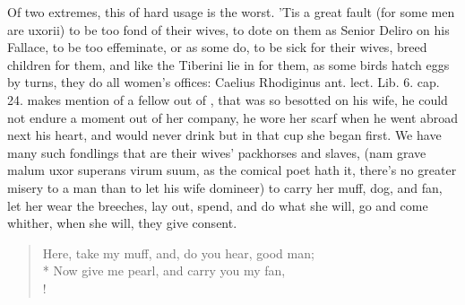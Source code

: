 Of two extremes, this of hard usage is the worst. 'Tis a great fault
(for some men are uxorii) to be too fond of their wives, to dote on
them as Senior Deliro on his Fallace, to be too effeminate, or as
some do, to be sick for their wives, breed children for them, and like
the  Tiberini lie in for them, as some birds hatch eggs by turns,
they do all women's offices: Caelius Rhodiginus ant. lect. Lib. 6. cap.
24. makes mention of a fellow out of \Seneca{}, that was so besotted
on his wife, he could not endure a moment out of her company, he wore
her scarf when he went abroad next his heart, and would never drink but
in that cup she began first. We have many such fondlings that are their
wives' packhorses and slaves, (nam grave malum uxor superans virum
suum, as the comical poet hath it, there's no greater misery to a man
than to let his wife domineer) to carry her muff, dog, and fan, let her
wear the breeches, lay out, spend, and do what she will, go and come
whither, when she will, they give consent.

\begin{verse}%
Here, take my muff, and, do you hear, good man;\\*
Now give me pearl, and carry you my fan, \etc{}\\!
\end{verse}%

